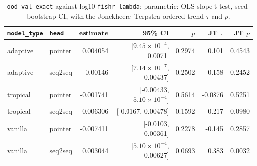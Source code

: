 \documentclass[10pt]{article}
\begin{document}
{\small
\begin{longtable}{llrrrrr}
\caption{\texttt{ood\_val\_exact} against log10 \texttt{fishr\_lambda}: parametric: OLS slope t-test, seed-bootstrap CI, with the Jonckheere--Terpstra ordered-trend $\tau$ and $p$.}\label{tab:trend-ood_val_exact}\\
\toprule
\texttt{model\_type} & \texttt{head} & estimate & 95\% CI & $p$ & JT $\tau$ & JT $p$\\
\midrule
\endhead
adaptive & pointer & 0.004054 & [$9.45\times10^{-4}$, 0.0071] & 0.2974 & 0.101 & 0.4543\\
adaptive & seq2seq & 0.00146 & [$7.14\times10^{-7}$, 0.00437] & 0.2502 & 0.158 & 0.2452\\
tropical & pointer & -0.001741 & [-0.00433, $5.10\times10^{-4}$] & 0.5614 & -0.0876 & 0.5251\\
tropical & seq2seq & -0.006306 & [-0.0167, 0.00478] & 0.1592 & -0.217 & 0.0980\\
vanilla & pointer & -0.007411 & [-0.0103, -0.00361] & 0.2278 & -0.145 & 0.2857\\
vanilla & seq2seq & 0.003044 & [$5.10\times10^{-4}$, 0.00627] & 0.0693 & 0.383 & 0.0032\\
\bottomrule
\end{longtable}
}
\end{document}
